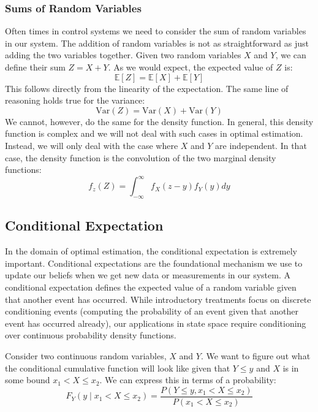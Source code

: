 \subsubsection{Sums of Random Variables}
Often times in control systems we need to consider the sum of random variables in our system. The addition of random variables is not as straightforward as just adding the two variables together. Given two random variables $X$ and $Y$, we can define their sum $Z=X+Y$. As we would expect, the expected value of $Z$ is:
$$\mathbb{E}[Z]=\mathbb{E}[X]+\mathbb{E}[Y]$$
This follows directly from the linearity of the expectation. The same line of reasoning holds true for the variance:
$$\text{Var}(Z)=\text{Var}(X)+\text{Var}(Y)$$
We cannot, however, do the same for the density function. In general, this density function is complex and we will not deal with such cases in optimal estimation. Instead, we will only deal with the case where $X$ and $Y$ are independent. In that case, the density function is the convolution of the two marginal density functions:
$$f_z(Z)=\int_{-\infty}^\infty f_X(z-y)f_Y(y)dy$$

\subsection{Conditional Expectation}
In the domain of optimal estimation, the conditional expectation is extremely important. Conditional expectations are the foundational mechanism we use to update our beliefs when we get new data or measurements in our system. A conditional expectation defines the expected value of a random variable given that another event has occurred. While introductory treatments focus on discrete conditioning events (computing the probability of an event given that another event has occurred already), our applications in state space require conditioning over continuous probability density functions.

Consider two continuous random variables, $X$ and $Y$. We want to figure out what the conditional cumulative function will look like given that $Y\le y$ and $X$ is in some bound $x_1<X\le x_2$. We can express this in terms of a probability:
\begin{equation}
F_Y(y \mid x_1 < X \le x_2) = \frac{P(Y \le y, x_1 < X \le x_2)}{P(x_1 < X \le x_2)}
\end{equation}

